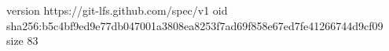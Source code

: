 version https://git-lfs.github.com/spec/v1
oid sha256:b5c4bf9ed9e77db047001a3808ea8253f7ad69f858e67ed7fe41266744d9cf09
size 83
